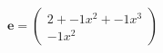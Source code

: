 \documentclass[preview]{standalone}
\begin{document}
\begin{align*}
\mathbf{e} = \begin{pmatrix}2 + -1x^{2} + -1x^{3} \\ -1x^{2}\end{pmatrix}
\end{align*}
\end{document}
